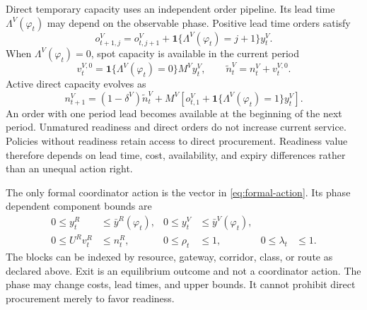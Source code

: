 \documentclass[a4paper,fleqn]{cas-sc}
\newcommand{\ind}{\mathbf{1}}           %
\begin{document}
Direct temporary capacity uses an independent order pipeline. Its lead time
$\Lambda^V(\varphi_t)$ may depend on the observable phase. Positive lead time
orders satisfy
\begin{equation}
 o^V_{t+1,j}=
 o^V_{t,j+1}
 +\ind\{\Lambda^V(\varphi_t)=j+1\}y_t^V.
 \label{eq:direct-capacity-pipeline}
\end{equation}
When $\Lambda^V(\varphi_t)=0$, spot capacity is available in the current period
\begin{equation}
 v_t^{V,0}=
 \ind\{\Lambda^V(\varphi_t)=0\}M^Vy_t^V,
 \qquad
 \widetilde n_t^V=n_t^V+v_t^{V,0}.
 \label{eq:spot-capacity}
\end{equation}
Active direct capacity evolves as
\begin{equation}
 n^V_{t+1}=
 (1-\delta^V)\widetilde n_t^V
 +M^V\left[
 o^V_{t,1}
 +\ind\{\Lambda^V(\varphi_t)=1\}y_t^V
 \right].
 \label{eq:direct-capacity-stock}
\end{equation}
An order with one period lead becomes available at the beginning of the next
period. Unmatured readiness and direct orders do not increase current service.
Policies without readiness retain access to direct procurement. Readiness value
therefore depends on lead time, cost, availability, and expiry differences
rather than an unequal action right.

The only formal coordinator action is the vector in
\cref{eq:formal-action}. Its phase dependent component bounds are
\begin{subequations}\label{eq:phase-actions}
\begin{align}
 0\le y_t^R&\le\bar y^R(\varphi_t),&
 0\le y_t^V&\le\bar y^V(\varphi_t),\\
 0\le U^Rv_t^R&\le n_t^R,&
 0\le\rho_t&\le1,&
 0\le\lambda_t&\le1.
\end{align}
\end{subequations}
The blocks can be indexed by resource, gateway, corridor, class, or route as
declared above. Exit is an equilibrium outcome and not a coordinator action.
The phase may change costs, lead times, and upper bounds. It cannot prohibit
direct procurement merely to favor readiness.
\end{document}
